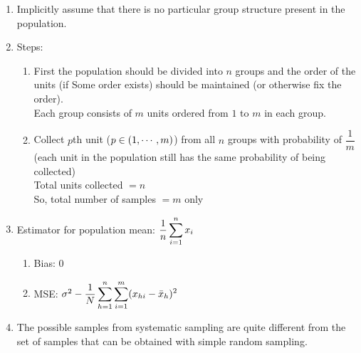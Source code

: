 \begin{enumerate}[itemsep=0.2cm]
    \item Implicitly assume that there is no particular group structure present in the population.
    \hfill \cite{statistics/book/Statistics-for-Data-Scientists/Maurits-Kaptein}

    \item Steps:
    \hfill \cite{statistics/book/Statistics-for-Data-Scientists/Maurits-Kaptein}
    \begin{enumerate}[itemsep=0.1cm]
        \item First the population should be divided into $n$ groups and the order of the units (if Some order exists) should be maintained (or otherwise fix the order).\\
        Each group consists of $m$ units ordered from $1$ to $m$ in each group.

        \item Collect $p$th unit ($p \in \left(1,\cdots,m\right)$) from all $n$ groups with probability of $\dfrac{1}{m}$\\
        (each unit in the population still has the same probability of being collected)\\
        Total units collected $= n$\\
        So, total number of samples $= m$ only

    \end{enumerate}

    \item Estimator for population mean: $
        \dfrac{1}{n} \displaystyle\sum_{i=1}^n x_i
    $
    \hfill \cite{statistics/book/Statistics-for-Data-Scientists/Maurits-Kaptein}
    \begin{enumerate}[itemsep=0.2cm]
        \item Bias: $0$
        \hfill \cite{statistics/book/Statistics-for-Data-Scientists/Maurits-Kaptein}

        \item MSE: $
            \sigma^2 -
            \dfrac{1}{N}
            \displaystyle\sum_{h=1}^{n}
            \displaystyle\sum_{i=1}^{m}
            (x_{hi} - \bar{x}_h)^2
        $
        \hfill \cite{statistics/book/Statistics-for-Data-Scientists/Maurits-Kaptein}
    \end{enumerate}

    \item The possible samples from systematic sampling are quite different from the set of samples that can be obtained with simple random sampling.
    \hfill \cite{statistics/book/Statistics-for-Data-Scientists/Maurits-Kaptein}


\end{enumerate}
